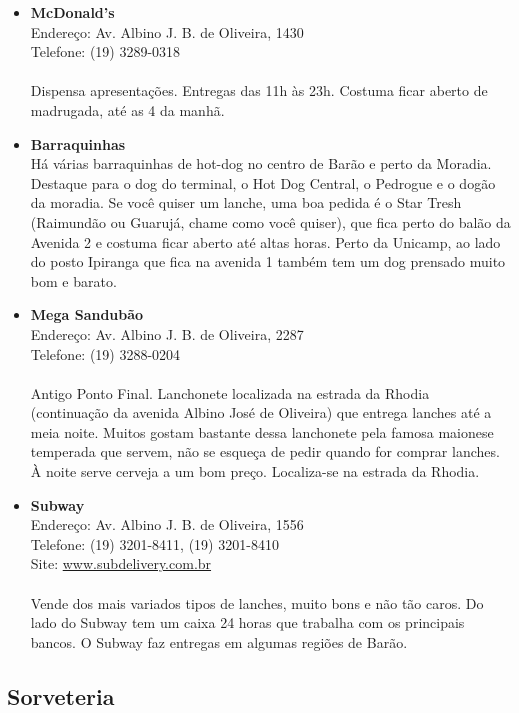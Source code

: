 \begin{itemize}
\item \textbf{McDonald's}
  \\Endereço: Av. Albino J. B. de Oliveira, 1430
  \\Telefone: (19) 3289-0318
  \\
  \\Dispensa apresentações. Entregas das 11h às 23h. Costuma ficar aberto
  de madrugada, até as 4 da manhã.

\item \textbf{Barraquinhas}
  \\Há várias barraquinhas de hot-dog no centro de Barão e perto da Moradia.
  Destaque para o dog do terminal, o Hot Dog Central, o Pedrogue e o dogão da
  moradia. Se você quiser um lanche, uma boa pedida é o Star Tresh (Raimundão
  ou Guarujá, chame como você quiser), que fica perto do balão da Avenida 2 e
  costuma ficar aberto até altas horas. Perto da Unicamp, ao lado do posto
  Ipiranga que fica na avenida 1 também tem um dog prensado muito bom e barato.

\item \textbf{Mega Sandubão}
  \\Endereço: Av. Albino J. B. de Oliveira, 2287
  \\Telefone: (19) 3288-0204
  \\
  \\Antigo Ponto Final. Lanchonete localizada na estrada da Rhodia
  (continuação da avenida Albino José de Oliveira) que entrega lanches até
  a meia noite. Muitos gostam bastante dessa lanchonete pela famosa maionese
  temperada que servem, não se esqueça de pedir quando for comprar lanches. À
  noite serve cerveja a um bom preço. Localiza-se na estrada da Rhodia.

\item \textbf{Subway}
  \\Endereço: Av. Albino J. B. de Oliveira, 1556
  \\Telefone: (19) 3201-8411, (19) 3201-8410
  \\Site: \url{www.subdelivery.com.br}
  \\
  \\Vende dos mais variados tipos de lanches, muito bons e não tão caros. Do
  lado do Subway tem um caixa 24 horas que trabalha com os principais bancos.
  O Subway faz entregas em algumas regiões de Barão.
\end{itemize}

\subsection{Sorveteria}

